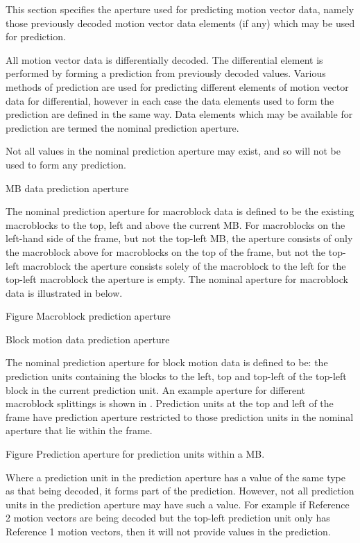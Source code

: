 This section specifies the aperture used for predicting motion vector
data, namely those previously decoded motion vector data elements (if
any) which may be used for prediction.

All motion vector data is differentially decoded. The differential
element is performed by forming a prediction from previously decoded
values. Various methods of prediction are used for predicting different
elements of motion vector data for differential, however in each case
the data elements used to form the prediction are defined in the same
way.  Data elements which may be available for prediction are termed the
nominal prediction aperture. 

Not all values in the nominal prediction aperture may exist, and so will
not be used to form any prediction. 

MB data prediction aperture

The nominal prediction aperture for macroblock data is defined to be the
existing macroblocks  to the top, left and above the current MB. For
macroblocks  on the left-hand side of the frame, but not the top-left
MB, the aperture consists of only the macroblock above for macroblocks
on the top of the frame, but not the top-left macroblock the aperture
consists solely of the macroblock to the left for the top-left
macroblock the aperture is empty. The nominal aperture for macroblock
data is illustrated in  below.




Figure  Macroblock prediction aperture

Block motion data prediction aperture

The nominal prediction aperture for block motion data is defined to be:
the prediction units containing the blocks to the left, top and top-left
of the top-left block in the current prediction unit. An example
aperture for different macroblock splittings is shown in . Prediction
units at the top and left of the frame have prediction aperture
restricted to those prediction units in the nominal aperture that lie
within the frame. 




Figure  Prediction aperture for prediction units within a MB.  

Where a prediction unit in the prediction aperture has a value of the
same type as that being decoded, it forms part of the prediction.
However, not all prediction units in the prediction aperture may have
such a value. For example if Reference 2 motion vectors are being
decoded but the top-left prediction unit only has Reference 1 motion
vectors, then it will not provide values in the prediction.  


